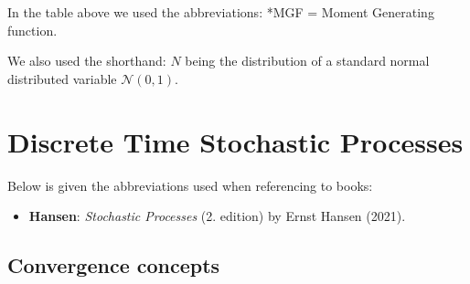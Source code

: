 \documentclass[a4paper,12pt,openany]{book}
\providecommand{\tightlist}{%
 \setlength{\itemsep}{0pt}\setlength{\parskip}{0pt}}
\begin{document}
In the table above we used the abbreviations: *MGF = Moment Generating function.

We also used the shorthand: \(N\) being the distribution of a standard normal distributed variable \(\mathcal{N}(0,1)\).

\hypertarget{discrete-time-stochastic-processes}{%
\chapter{Discrete Time Stochastic Processes}\label{discrete-time-stochastic-processes}}

Below is given the abbreviations used when referencing to books:

\begin{itemize}
\tightlist
\item
  \textbf{Hansen}: \emph{Stochastic Processes} (2. edition) by Ernst Hansen (2021).\cite{hansen2021}
\end{itemize}

\hypertarget{convergence-concepts}{%
\section{Convergence concepts}\label{convergence-concepts}}
\end{document}
